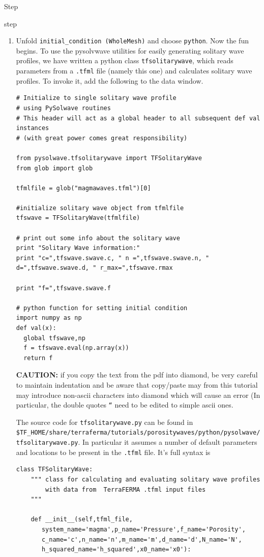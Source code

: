 \begin{steps}{Step}
\begin{steps}{step}
\begin{enumerate}
    \item Unfold \texttt{initial\_condition (WholeMesh)} and choose
      \texttt{python}.  Now the fun begins. To use the pysolvwave
      utilities for easily generating solitary wave profiles,  we have
      written a python class \texttt{tfsolitarywave},  which reads
      parameters from a \texttt{.tfml} file (namely this one) and
      calculates solitary wave profiles.  To invoke it, add the
      following to the data window.
      \begin{lstlisting}[style=Python]
# Initialize to single solitary wave profile 
# using PySolwave routines 
# This header will act as a global header to all subsequent def val instances
# (with great power comes great responsibility)

from pysolwave.tfsolitarywave import TFSolitaryWave
from glob import glob

tfmlfile = glob("magmawaves.tfml")[0]

#initialize solitary wave object from tfmlfile
tfswave = TFSolitaryWave(tfmlfile)

# print out some info about the solitary wave 
print "Solitary Wave information:"
print "c=",tfswave.swave.c, " n =",tfswave.swave.n, " d=",tfswave.swave.d, " r_max=",tfswave.rmax

print "f=",tfswave.swave.f

# python function for setting initial condition
import numpy as np
def val(x):
  global tfswave,np
  f = tfswave.eval(np.array(x))
  return f
\end{lstlisting}
\textbf{CAUTION:} if you copy the text from the pdf into diamond, be
very careful to maintain indentation and be aware that copy/paste may
from this tutorial may introduce non-ascii characters into diamond
which will cause an error (In particular, the double quotes
\texttt{``} need to be edited to simple ascii ones.

The source code for \texttt{tfsolitarywave.py} can be found in
\texttt{\$TF\_HOME/share/terraferma/tutorials/porositywaves/python/pysolwave/tfsolitarywave.py}. In
particular it assumes a number of default parameters and locations to
be present in the \texttt{.tfml} file.  It's full syntax is
\begin{lstlisting}[style=Python]
class TFSolitaryWave:
    """ class for calculating and evaluating solitary wave profiles
        with data from  TerraFERMA .tfml input files
    """

    def __init__(self,tfml_file,
       system_name='magma',p_name='Pressure',f_name='Porosity',
       c_name='c',n_name='n',m_name='m',d_name='d',N_name='N',
       h_squared_name='h_squared',x0_name='x0'):
        

\end{lstlisting}
\end{enumerate}
\end{steps}
\end{steps}
